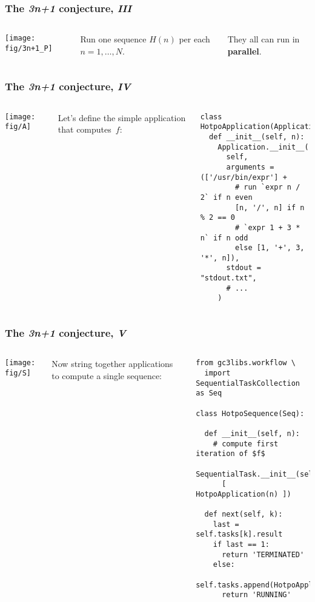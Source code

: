 \documentclass[english,serif,mathserif,xcolor=pdftex,dvipsnames,table]{beamer}
\begin{document}
\begin{frame}
  \frametitle{The \emph{3n+1} conjecture, \emph{III}}
  \label{sec:7c}

  \+
  \begin{columns}[c]
    \texttt{[image: fig/3n+1\_P]}

    Run one sequence $H(n)$ per each $n = 1, \ldots, N$.

    \+
    They all can run in \textbf{parallel}.
  \end{columns}
\end{frame}

\begin{frame}[fragile]
  \frametitle{The \emph{3n+1} conjecture, \emph{IV}}
  \label{sec:10}

  \begin{columns}
    \begin{center}
      \texttt{[image: fig/A]}
    \end{center}

    Let's define the simple application that computes~$f$:
    \begin{lstlisting}
class HotpoApplication(Application):
  def __init__(self, n):
    Application.__init__(
      self,
      arguments = (['/usr/bin/expr'] +
        # run `expr n / 2` if n even
        [n, '/', n] if n % 2 == 0
        # `expr 1 + 3 * n` if n odd
        else [1, '+', 3, '*', n]),
      stdout = "stdout.txt",
      # ...
    )
    \end{lstlisting}
  \end{columns}
\end{frame}

\begin{frame}[fragile]
  \frametitle{The \emph{3n+1} conjecture, \emph{V}}
  \label{sec:14}

  \begin{columns}
    \begin{center}
      \texttt{[image: fig/S]}
    \end{center}

    \small
    Now string together applications to compute a
    single sequence:
    \begin{lstlisting}[basicstyle=\ttfamily\footnotesize]
from gc3libs.workflow \
  import SequentialTaskCollection as Seq

class HotpoSequence(Seq):

  def __init__(self, n):
    # compute first iteration of $f$
    SequentialTask.__init__(self,
      [ HotpoApplication(n) ])

  def next(self, k):
    last = self.tasks[k].result
    if last == 1:
      return 'TERMINATED'
    else:
      self.tasks.append(HotpoApplication(last))
      return 'RUNNING'
    \end{lstlisting}
  \end{columns}
\end{frame}
\end{document}
